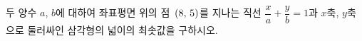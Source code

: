 두 양수 $a$, $b$에 대하여 좌표평면 위의 점~$(8,\mkern3mu 5)$를 지나는 직선 $\dfrac{x}{a}+\dfrac{y}{b}=1$과 $x$축, $y$축으로 둘러싸인 삼각형의 넓이의 최솟값을 구하시오.
